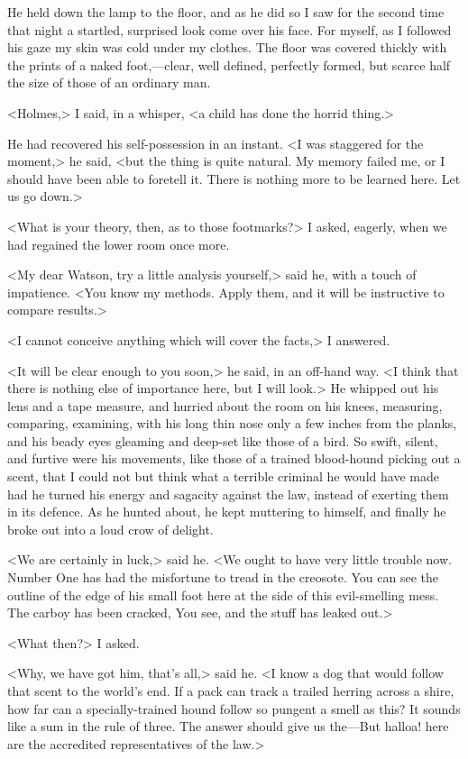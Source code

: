 He held down the lamp to the floor, and as he did so I saw for the second time that night a startled, surprised look come over his face. For myself, as I followed his gaze my skin was cold under my clothes. The floor was covered thickly with the prints of a naked foot,—clear, well defined, perfectly formed, but scarce half the size of those of an ordinary man.

<Holmes,> I said, in a whisper, <a child has done the horrid thing.>

He had recovered his self-possession in an instant. <I was staggered for the moment,> he said, <but the thing is quite natural. My memory failed me, or I should have been able to foretell it. There is nothing more to be learned here. Let us go down.>

<What is your theory, then, as to those footmarks?> I asked, eagerly, when we had regained the lower room once more.

<My dear Watson, try a little analysis yourself,> said he, with a touch of impatience. <You know my methods. Apply them, and it will be instructive to compare results.>

<I cannot conceive anything which will cover the facts,> I answered.

<It will be clear enough to you soon,> he said, in an off-hand way. <I think that there is nothing else of importance here, but I will look.> He whipped out his lens and a tape measure, and hurried about the room on his knees, measuring, comparing, examining, with his long thin nose only a few inches from the planks, and his beady eyes gleaming and deep-set like those of a bird. So swift, silent, and furtive were his movements, like those of a trained blood-hound picking out a scent, that I could not but think what a terrible criminal he would have made had he turned his energy and sagacity against the law, instead of exerting them in its defence. As he hunted about, he kept muttering to himself, and finally he broke out into a loud crow of delight.

<We are certainly in luck,> said he. <We ought to have very little trouble now. Number One has had the misfortune to tread in the creosote. You can see the outline of the edge of his small foot here at the side of this evil-smelling mess. The carboy has been cracked, You see, and the stuff has leaked out.>

<What then?> I asked.

<Why, we have got him, that's all,> said he. <I know a dog that would follow that scent to the world's end. If a pack can track a trailed herring across a shire, how far can a specially-trained hound follow so pungent a smell as this? It sounds like a sum in the rule of three. The answer should give us the—But halloa! here are the accredited representatives of the law.>

